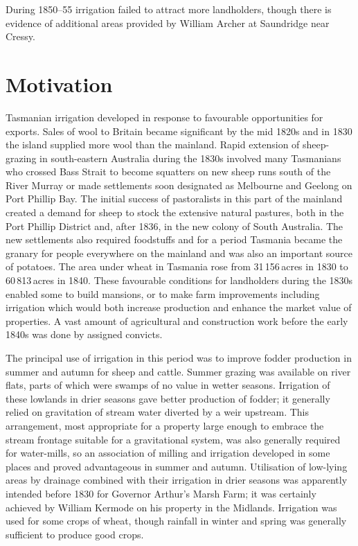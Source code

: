 During 1850--55 irrigation failed to attract more landholders, though
there is evidence of additional areas provided by William Archer at
Saundridge near Cressy.

\section*{Motivation}

Tasmanian irrigation developed in response to favourable opportunities
for exports.  Sales of wool to Britain became significant
by the mid 1820s and in 1830 the island supplied more wool than the
mainland.  Rapid extension of sheep-grazing in south-eastern Australia
during the 1830s involved many Tasmanians who crossed Bass Strait to
become squatters on new sheep runs south of the River
Murray or made settlements soon designated as
Melbourne and Geelong on
Port Phillip Bay. The initial success of
pastoralists in this part of the mainland created a demand for sheep
to stock the extensive natural pastures, both in the Port Phillip
District and, after 1836, in the new colony of South
Australia. The new settlements also required
foodstuffs and for a period Tasmania became the granary for people
everywhere on the mainland and was also an important source of
potatoes.  The area under wheat in Tasmania rose from 31\,156\,acres
in 1830 to 60\,813\,acres in 1840.  These favourable conditions for
landholders during the 1830s enabled some to build mansions, or to
make farm improvements including irrigation which would both increase
production and enhance the market value of properties.  A vast amount
of agricultural and construction work before the early 1840s was done
by assigned convicts.

The principal use of irrigation in this period was to improve fodder
production in summer and autumn for sheep and cattle. Summer grazing
was available on river flats, parts of which were swamps of no value
in wetter seasons.  Irrigation of these lowlands in drier seasons gave
better production of fodder; it generally relied on gravitation of
stream water diverted by a weir upstream.  This arrangement, most
appropriate for a property large enough to embrace the stream frontage
suitable for a gravitational system, was also generally required for
water-mills, so an association of milling and irrigation developed in
some places and proved advantageous in summer and autumn.  Utilisation
of low-lying areas by drainage combined with their irrigation in drier
seasons was apparently intended before 1830 for Governor Arthur's
Marsh Farm; it was certainly achieved by William Kermode on his
property in the Midlands.  Irrigation was used for some crops of
wheat, though rainfall in winter and spring was generally sufficient
to produce good crops.

